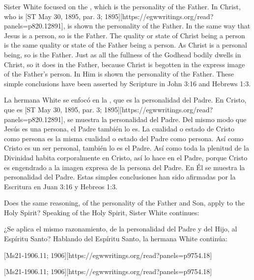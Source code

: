 Sister White focused on the , which is the personality of the Father. In Christ, who is [ST May 30, 1895, par. 3; 1895][https://egwwritings.org/read?panels=p820.12891], is shown the personality of the Father. In the same way that Jesus is a person, so is the Father. The quality or state of Christ being a person is the same quality or state of the Father being a person. As Christ is a personal being, so is the Father. Just as all the fullness of the Godhead bodily dwells in Christ, so it does in the Father, because Christ is begotten in the express image of the Father’s person. In Him is shown the personality of the Father. These simple conclusions have been asserted by Scripture in John 3:16 and Hebrews 1:3.


La hermana White se enfocó en la , que es la personalidad del Padre. En Cristo, que es [ST May 30, 1895, par. 3; 1895][https://egwwritings.org/read?panels=p820.12891], se muestra la personalidad del Padre. Del mismo modo que Jesús es una persona, el Padre también lo es. La cualidad o estado de Cristo como persona es la misma cualidad o estado del Padre como persona. Así como Cristo es un ser personal, también lo es el Padre. Así como toda la plenitud de la Divinidad habita corporalmente en Cristo, así lo hace en el Padre, porque Cristo es engendrado a la imagen expresa de la persona del Padre. En Él se muestra la personalidad del Padre. Estas simples conclusiones han sido afirmadas por la Escritura en Juan 3:16 y Hebreos 1:3.


Does the same reasoning, of the personality of the Father and Son, apply to the Holy Spirit? Speaking of the Holy Spirit, Sister White continues:


¿Se aplica el mismo razonamiento, de la personalidad del Padre y del Hijo, al Espíritu Santo? Hablando del Espíritu Santo, la hermana White continúa:


[Ms21-1906.11; 1906][https://egwwritings.org/read?panels=p9754.18]


[Ms21-1906.11; 1906][https://egwwritings.org/read?panels=p9754.18]


